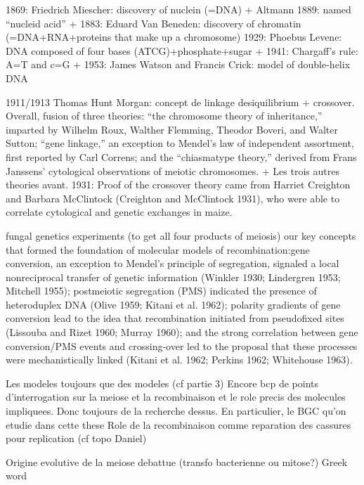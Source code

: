 1869: Friedrich Miescher: discovery of nuclein (=DNA) + Altmann 1889: named “nucleid acid”
+ 1883: Eduard Van Beneden: discovery of chromatin (=DNA+RNA+proteins that make up a chromosome)
1929: Phoebus Levene: DNA composed of four bases (ATCG)+phosphate+sugar
+ 1941: Chargaff's rule: A=T and c=G
+ 1953: James Watson and Francis Crick: model of double-helix DNA

1911/1913 Thomas Hunt Morgan: concept de linkage desiquilibrium + crossover. Overall, fusion of three theories: “the chromosome theory of inheritance,” imparted by Wilhelm Roux, Walther Flemming, Theodor Boveri, and Walter Sutton; “gene linkage,” an exception to Mendel’s law of independent assortment, first reported by Carl Correns; and the “chiasmatype theory,” derived from Frans Janssens' cytological observations of meiotic chromosomes.
+ Les trois autres theories avant. 
1931: Proof of the crossover theory came from Harriet Creighton and Barbara McClintock (Creighton and McClintock 1931), who were able to correlate cytological and genetic exchanges in maize.

fungal genetics experiments (to get all four products of meiosis)
our key concepts that formed the foundation of molecular models of recombination:gene conversion, an exception to Mendel’s principle of segregation, signaled a local nonreciprocal transfer of genetic information (Winkler 1930; Lindergren 1953; Mitchell 1955); postmeiotic segregation (PMS) indicated the presence of heteroduplex DNA (Olive 1959; Kitani et al. 1962); polarity gradients of gene conversion lead to the idea that recombination initiated from pseudofixed sites (Lissouba and Rizet 1960; Murray 1960); and the strong correlation between gene conversion/PMS events and crossing-over led to the proposal that these processes were mechanistically linked (Kitani et al. 1962; Perkins 1962; Whitehouse 1963).


Les modeles toujours que des modeles (cf partie 3)
Encore bcp de points d'interrogation sur la meiose et la recombinaison et le role precis des molecules impliquees. Donc toujours de la recherche dessus.
En particulier, le BGC qu'on etudie dans cette these
Role de la recombinaison comme reparation des cassures pour replication  (cf topo Daniel)


Origine evolutive de la meiose debattue (transfo bacterienne ou mitose?)
Greek word






